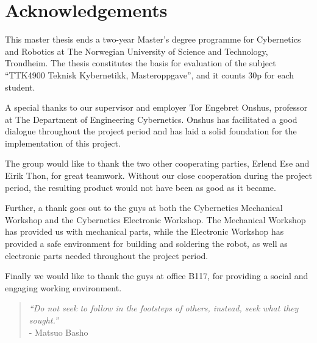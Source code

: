 \chapter*{Acknowledgements}
This master thesis ends a two-year Master's degree programme for Cybernetics and Robotics at The Norwegian University of Science and Technology, Trondheim. The thesis constitutes the basis for evaluation of the subject ``TTK4900 Teknisk Kybernetikk, Masteroppgave'', and it counts 30p for each student.

A special thanks to our supervisor and employer Tor Engebret Onshus, professor at The Department of Engineering Cybernetics. Onshus has facilitated a good dialogue throughout the project period and has laid a solid foundation for the implementation of this project.

The group would like to thank the two other cooperating parties, Erlend Ese and Eirik Thon, for great teamwork. Without our close cooperation during the project period, the resulting product would not have been as good as it became.

Further, a thank goes out to the guys at both the Cybernetics Mechanical Workshop and the Cybernetics Electronic Workshop. The Mechanical Workshop has provided us with mechanical parts, while the Electronic Workshop has provided a safe environment for building and soldering the robot, as well as electronic parts needed throughout the project period.

Finally we would like to thank the guys at office B117, for providing a social and engaging working environment.
\\[5mm]

\begin{quotation}
\color{darkred}
 \textit{``Do not seek to follow in the footsteps of others, instead, seek what they sought.''} \\
 - Matsuo Basho
\end{quotation}

